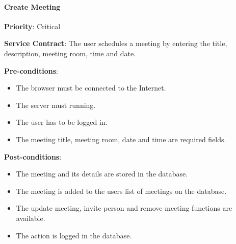    	\paragraph{Create Meeting}
			\begin{description}
			    \item{\textbf{Priority}:} Critical
			    \item{\textbf{Service Contract}:} The user schedules a meeting by entering the title, description, meeting room, time and date.
			    \item{\textbf{Pre-conditions}:}
    			    \begin{itemize}
    			        \item The browser must be connected to the Internet.
    			        \item The server must running.    		  
    			        \item The user has to be logged in. 
    			        \item The meeting title, meeting room, date and time are required fields.
    			    \end{itemize}
			    \item{\textbf{Post-conditions}:} 
    			    \begin{itemize}
    			      \item The meeting and its details are stored in the database.
    			      \item The meeting is  added to the users list of meetings on the database. 
    			      \item The update meeting, invite person and remove meeting functions are available. 
    			      \item  The action is logged in the database. 
    			    \end{itemize}
			\end{description}
			
